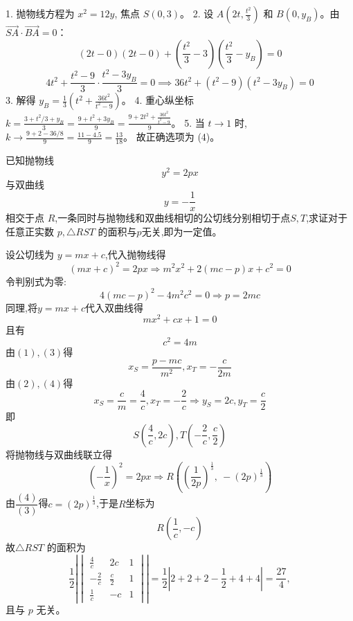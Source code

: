 \begin{questions}
\begin{solution}
1. 抛物线方程为 $x^2 = 12y$, 焦点 $S(0, 3)$。
2. 设 $A(2t, \frac{t^2}{3})$ 和 $B(0, y_B)$。由 $\vec{SA} \cdot \vec{BA} = 0$：
\[ (2t - 0)(2t - 0) + (\frac{t^2}{3} - 3)(\frac{t^2}{3} - y_B) = 0 \]
\[ 4t^2 + \frac{t^2 - 9}{3} \cdot \frac{t^2 - 3y_B}{3} = 0 \implies 36t^2 + (t^2 - 9)(t^2 - 3y_B) = 0 \]
3. 解得 $y_B = \frac{1}{3} \left( t^2 + \frac{36t^2}{t^2 - 9} \right)$。
4. 重心纵坐标 $k = \frac{3 + t^2/3 + y_B}{3} = \frac{9 + t^2 + 3y_B}{9} = \frac{9 + 2t^2 + \frac{36t^2}{t^2 - 9}}{9}$。
5. 当 $t \to 1$ 时, $k \to \frac{9 + 2 - 36/8}{9} = \frac{11 - 4.5}{9} = \frac{13}{18}$。
故正确选项为 (4)。
\end{solution}
    \question 已知抛物线 $$y^2 = 2px$$ 与双曲线 $$y = -\dfrac{1}{x}$$ 相交于点 $R$,一条同时与抛物线和双曲线相切的公切线分别相切于点$S,T$,求证对于任意正实数 $p,\triangle RST$ 的面积与$p$无关,即为一定值。
    \begin{solution}
        设公切线为 $y=mx+c$,代入抛物线得
        \[
        (mx+c)^2 = 2px \Rightarrow m^2x^2 + 2(mc-p)x + c^2 = 0 \tag{1}
        \]
        令判别式为零:
        \[
        4(mc - p)^2 - 4m^2c^2 = 0 \Rightarrow p=2mc \tag{2}
        \]
        同理,将$y = mx + c$代入双曲线得
        \[
        mx^2 + cx + 1 = 0 \tag{3}
        \]
        且有
        \[
        c^2 = 4m \tag{4}
        \]
        由$(1),(3)$得
        \[
        x_{S}=\frac{p-mc}{m^2}, x_{T}=-\frac{c}{2m} 
        \]
        由$(2),(4)$得
        \[
        x_{S}=\frac{c}{m}=\frac{4}{c}, x_{T}=-\frac{2}{c} \Rightarrow y_{S}=2c, y_{T}=\frac{c}{2}
        \]
        即\[
        S\left(\frac{4}{c},2c\right),T\left(-\frac{2}{c},\frac{c}{2}\right)
        \]
        将抛物线与双曲线联立得
        \[
        \left(-\frac{1}{x}\right)^2 = 2px \Rightarrow
        R\left( \left( \frac{1}{2p} \right)^{\frac13},\ -\left(2p\right)^{\frac13} \right)
        \]
        由$\dfrac{(4)}{(3)}$得$c=(2p)^{\frac13}$,于是$R$坐标为
        \[
        R\left(\frac{1}{c},-c\right)
        \]
        故$\triangle RST$ 的面积为
        \[
        \frac{1}{2} \left| 
        \begin{vmatrix}
        \frac{4}{c} & 2c & 1 \\
        -\frac{2}{c} & \frac{c}{2} & 1 \\
        \frac{1}{c} & -c & 1
        \end{vmatrix}
        \right|=\frac{1}{2} \left|2+2+2-\frac12+4+4\right|=\frac{27}{4},
        \]
        且与 \(p\) 无关。
    \end{solution}


\end{questions}
